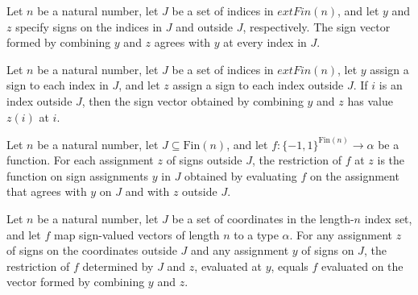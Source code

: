 \begin{theorem}
\label{FABL.combineSignCube_apply_free}
\leanok
{}
Let $n$ be a natural number, let $J$ be a set of indices in $	ext{Fin}(n)$, and let $y$
and $z$ specify signs on the indices in $J$ and outside $J$, respectively. The sign
vector formed by combining $y$ and $z$ agrees with $y$ at every index in $J$.
\end{theorem}

\begin{theorem}
\label{FABL.combineSignCube_apply_fixed}
\leanok
{}
Let $n$ be a natural number, let $J$ be a set of indices in $	ext{Fin}(n)$, let $y$
assign a sign to each index in $J$, and let $z$ assign a sign to each index outside $J$.
If $i$ is an index outside $J$, then the sign vector obtained by combining $y$ and $z$
has value $z(i)$ at $i$.
\end{theorem}

\begin{definition}
\label{FABL.signRestriction}
\leanok
{}
Let $n$ be a natural number, let $J\subseteq\mathrm{Fin}(n)$, and let
$f:\{−1,1\}^{\mathrm{Fin}(n)}\to\alpha$ be a function. For each assignment $z$ of signs
outside $J$, the restriction of $f$ at $z$ is the function on sign assignments $y$ in
$J$ obtained by evaluating $f$ on the assignment that agrees with $y$ on $J$ and with
$z$ outside $J$.
\end{definition}

\begin{theorem}
\label{FABL.signRestriction_apply}
\leanok
{}
Let $n$ be a natural number, let $J$ be a set of coordinates in the length-$n$ index
set, and let $f$ map sign-valued vectors of length $n$ to a type $\alpha$. For any
assignment $z$ of signs on the coordinates outside $J$ and any assignment $y$ of signs
on $J$, the restriction of $f$ determined by $J$ and $z$, evaluated at $y$, equals $f$
evaluated on the vector formed by combining $y$ and $z$.
\end{theorem}

